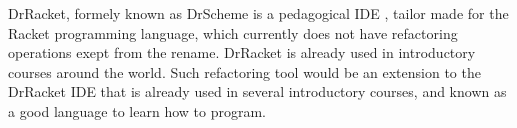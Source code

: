 DrRacket, formely known as DrScheme is a pedagogical IDE \cite{drscheme} \cite{drscheme_pegadogy},
tailor made for the Racket programming language, which currently does not
have refactoring operations exept from the rename.
DrRacket is already used in introductory courses around the world.
Such refactoring tool would be an extension to the DrRacket IDE that is already
used in several introductory courses, and known as a good language to learn how to program.


